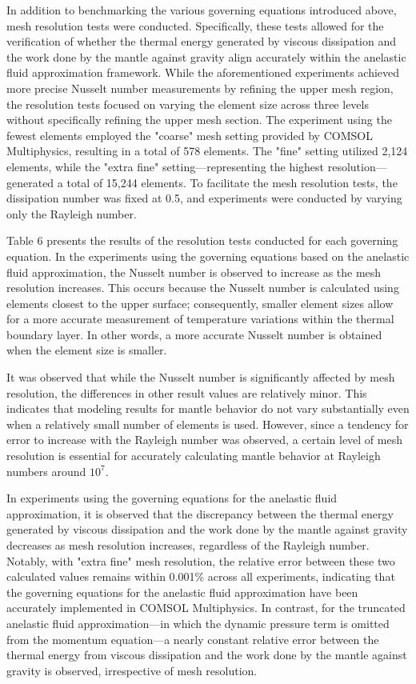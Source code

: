 In addition to benchmarking the various governing equations introduced above, mesh resolution tests were conducted. Specifically, these tests allowed for the verification of whether the thermal energy generated by viscous dissipation and the work done by the mantle against gravity align accurately within the anelastic fluid approximation framework. While the aforementioned experiments achieved more precise Nusselt number measurements by refining the upper mesh region, the resolution tests focused on varying the element size across three levels without specifically refining the upper mesh section. The experiment using the fewest elements employed the "coarse" mesh setting provided by COMSOL Multiphysics, resulting in a total of 578 elements. The "fine" setting utilized 2,124 elements, while the "extra fine" setting—representing the highest resolution—generated a total of 15,244 elements. To facilitate the mesh resolution tests, the dissipation number was fixed at 0.5, and experiments were conducted by varying only the Rayleigh number.

Table 6 presents the results of the resolution tests conducted for each governing equation. In the experiments using the governing equations based on the anelastic fluid approximation, the Nusselt number is observed to increase as the mesh resolution increases. This occurs because the Nusselt number is calculated using elements closest to the upper surface; consequently, smaller element sizes allow for a more accurate measurement of temperature variations within the thermal boundary layer. In other words, a more accurate Nusselt number is obtained when the element size is smaller.

It was observed that while the Nusselt number is significantly affected by mesh resolution, the differences in other result values are relatively minor. This indicates that modeling results for mantle behavior do not vary substantially even when a relatively small number of elements is used. However, since a tendency for error to increase with the Rayleigh number was observed, a certain level of mesh resolution is essential for accurately calculating mantle behavior at Rayleigh numbers around $10^7$.

In experiments using the governing equations for the anelastic fluid approximation, 
it is observed that the discrepancy between the thermal energy generated by viscous 
dissipation and the work done by the mantle against gravity decreases as mesh resolution 
increases, regardless of the Rayleigh number. Notably, with "extra fine" mesh resolution, 
the relative error between these two calculated values remains within 0.001\% across 
all experiments, indicating that the governing equations for the anelastic fluid approximation 
have been accurately implemented in COMSOL Multiphysics. In contrast, for the truncated 
anelastic fluid approximation—in which the dynamic pressure term is omitted from the momentum 
equation—a nearly constant relative error between the thermal energy from viscous dissipation 
and the work done by the mantle against gravity is observed, irrespective of mesh resolution.


